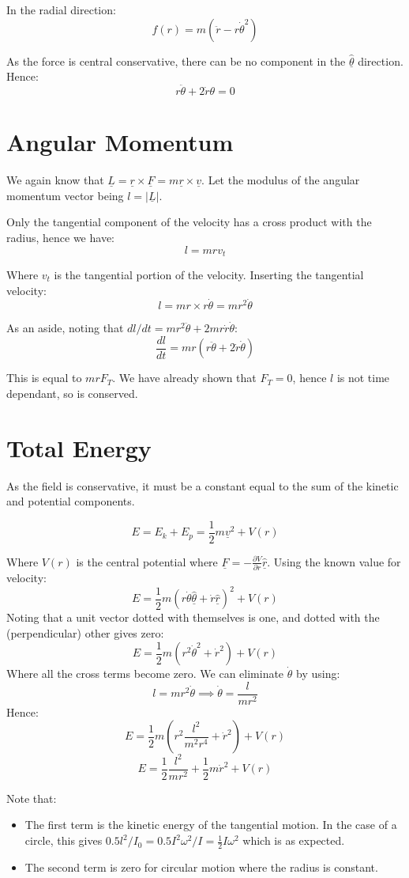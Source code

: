 In the radial direction:
\[
    f(r) = m \left(\ddot{r} - r \dot{\theta}^2\right) \tag{4}
\]

As the force is central conservative, there can be no component in the $\hat{\underline{\theta}}$ direction. Hence:
\[
    r \ddot{\theta} + 2 \dot{r} \theta = 0 \tag{5}
\]

\section{Angular Momentum}
We again know that $\underline{L} = \underline{r} \times \underline{F} = m \underline{r} \times \underline{v}$. Let the modulus of the angular momentum vector being $l = |\underline{L}|$.

Only the tangential component of the velocity has a cross product with the radius, hence we have:
\[
    l = mr v_t
\]

Where $v_t$ is the tangential portion of the velocity. Inserting the tangential velocity:
\[
    l = mr \times r \dot{\theta} = mr^2 \dot{\theta}
\]

As an aside, noting that $dl/dt = mr^2 \ddot{\theta} + 2m r \dot{r} \dot{\theta}$:
\[
    \frac{dl}{dt} = mr \left(r \ddot{\theta} + 2 \dot{r} \dot{\theta}\right)
\]

This is equal to $mr F_T$. We have already shown that $F_T = 0$, hence $l$ is not time dependant, so is conserved.

\section{Total Energy}
As the field is conservative, it must be a constant equal to the sum of the kinetic and potential components.

\[
    E = E_k + E_p = \frac{1}{2}m \underline{v}^2 + V(r)
\]

Where $V(r)$ is the central potential where $\underline{F} = - \frac{\partial V}{\partial r} \underline{\hat{r}}$. Using the known value for velocity:
\[
    E = \frac{1}{2}m \left(r \dot{\theta} \hat{\underline{\theta}} + \dot{r} \hat{\underline{r}}\right)^2 + V(r)
\]
Noting that a unit vector dotted with themselves is one, and dotted with the (perpendicular) other gives zero:
\[
    E = \frac{1}{2}m \left(r^2 \dot{\theta}^2 + \dot{r}^2\right) + V(r)
\]
Where all the cross terms become zero. We can eliminate $\dot{\theta}$ by using:
\[
    l = mr^2 \dot{\theta} \implies \dot{\theta} = \frac{l}{mr^2}
\]
Hence:
\[
    E = \frac{1}{2}m \left(r^2 \frac{l^2}{m^2 r^4} + \dot{r}^2\right) + V(r)
\]
\[
    \boxed{E = \frac{1}{2}\frac{l^2}{mr^2} + \frac{1}{2}m \dot{r}^2 + V(r)}
\]

Note that:
\begin{itemize}
    \item The first term is the kinetic energy of the tangential motion. In the case of a circle, this gives $0.5 l^2/I_0 = 0.5 I^2 \omega^2 / I = \frac{1}{2}I \omega^2$ which is as expected.
    \item The second term is zero for circular motion where the radius is constant.
\end{itemize}
